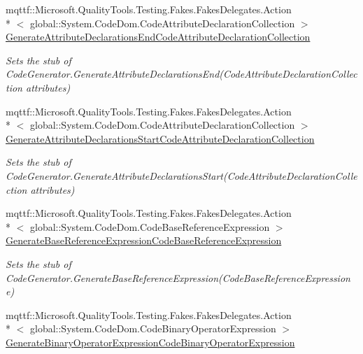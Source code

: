 \begin{DoxyCompactItemize}
mqttf\-::\-Microsoft.\-Quality\-Tools.\-Testing.\-Fakes.\-Fakes\-Delegates.\-Action\\*
$<$ global\-::\-System.\-Code\-Dom.\-Code\-Attribute\-Declaration\-Collection $>$ \hyperlink{class_system_1_1_code_dom_1_1_compiler_1_1_fakes_1_1_stub_code_generator_ae02c5c3fc4b110a3729c66ad85f4dec9}{Generate\-Attribute\-Declarations\-End\-Code\-Attribute\-Declaration\-Collection}
\begin{DoxyCompactList}\small\item\em Sets the stub of Code\-Generator.\-Generate\-Attribute\-Declarations\-End(\-Code\-Attribute\-Declaration\-Collection attributes)\end{DoxyCompactList}\item 
mqttf\-::\-Microsoft.\-Quality\-Tools.\-Testing.\-Fakes.\-Fakes\-Delegates.\-Action\\*
$<$ global\-::\-System.\-Code\-Dom.\-Code\-Attribute\-Declaration\-Collection $>$ \hyperlink{class_system_1_1_code_dom_1_1_compiler_1_1_fakes_1_1_stub_code_generator_a62120e95fe139c6ff5a380f72b9bc724}{Generate\-Attribute\-Declarations\-Start\-Code\-Attribute\-Declaration\-Collection}
\begin{DoxyCompactList}\small\item\em Sets the stub of Code\-Generator.\-Generate\-Attribute\-Declarations\-Start(\-Code\-Attribute\-Declaration\-Collection attributes)\end{DoxyCompactList}\item 
mqttf\-::\-Microsoft.\-Quality\-Tools.\-Testing.\-Fakes.\-Fakes\-Delegates.\-Action\\*
$<$ global\-::\-System.\-Code\-Dom.\-Code\-Base\-Reference\-Expression $>$ \hyperlink{class_system_1_1_code_dom_1_1_compiler_1_1_fakes_1_1_stub_code_generator_a976ea426a0010f701f16a96631df6bd9}{Generate\-Base\-Reference\-Expression\-Code\-Base\-Reference\-Expression}
\begin{DoxyCompactList}\small\item\em Sets the stub of Code\-Generator.\-Generate\-Base\-Reference\-Expression(\-Code\-Base\-Reference\-Expression e)\end{DoxyCompactList}\item 
mqttf\-::\-Microsoft.\-Quality\-Tools.\-Testing.\-Fakes.\-Fakes\-Delegates.\-Action\\*
$<$ global\-::\-System.\-Code\-Dom.\-Code\-Binary\-Operator\-Expression $>$ \hyperlink{class_system_1_1_code_dom_1_1_compiler_1_1_fakes_1_1_stub_code_generator_af4bb057662563c21c15f19b8663e2e23}{Generate\-Binary\-Operator\-Expression\-Code\-Binary\-Operator\-Expression}

\end{DoxyCompactItemize}
